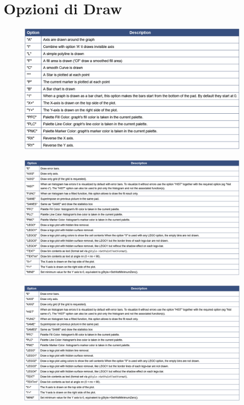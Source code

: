 \documentclass[10pt,a4paper]{article}
\begin{document}
\section{Opzioni di Draw}\label{sec:Draw}
\begin{figure}[h!]
	\centering
	\includegraphics[width=0.5\linewidth]{"Screenshot 2022-06-04 221503"}
\end{figure}
\FloatBarrier
\begin{figure}[h!]
	\centering
	\includegraphics[width=0.5\linewidth]{"Screenshot 2022-06-04 222020"}
\end{figure}
\FloatBarrier
\begin{figure}[h!]
	\centering
	\includegraphics[width=0.5\linewidth]{"Screenshot 2022-06-04 222115"}
\end{figure}
\FloatBarrier
\end{document}
